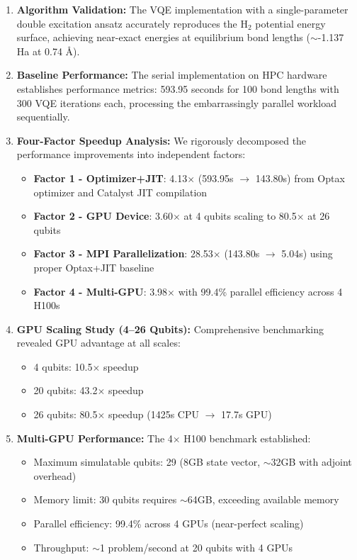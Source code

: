 \documentclass[11pt]{article}
\begin{document}
\begin{enumerate}
    \item \textbf{Algorithm Validation:} The VQE implementation with a single-parameter double excitation ansatz accurately reproduces the H$_2$ potential energy surface, achieving near-exact energies at equilibrium bond lengths ($\sim$-1.137 Ha at 0.74 \AA).

    \item \textbf{Baseline Performance:} The serial implementation on HPC hardware establishes performance metrics: 593.95 seconds for 100 bond lengths with 300 VQE iterations each, processing the embarrassingly parallel workload sequentially.

    \item \textbf{Four-Factor Speedup Analysis:} We rigorously decomposed the performance improvements into independent factors:
          \begin{itemize}
              \item \textbf{Factor 1 - Optimizer+JIT}: 4.13$\times$ (593.95s $\rightarrow$ 143.80s) from Optax optimizer and Catalyst JIT compilation
              \item \textbf{Factor 2 - GPU Device}: 3.60$\times$ at 4 qubits scaling to 80.5$\times$ at 26 qubits
              \item \textbf{Factor 3 - MPI Parallelization}: 28.53$\times$ (143.80s $\rightarrow$ 5.04s) using proper Optax+JIT baseline
              \item \textbf{Factor 4 - Multi-GPU}: 3.98$\times$ with 99.4\% parallel efficiency across 4 H100s
          \end{itemize}

    \item \textbf{GPU Scaling Study (4--26 Qubits):} Comprehensive benchmarking revealed GPU advantage at all scales:
          \begin{itemize}
              \item 4 qubits: 10.5$\times$ speedup
              \item 20 qubits: 43.2$\times$ speedup
              \item 26 qubits: 80.5$\times$ speedup (1425s CPU $\rightarrow$ 17.7s GPU)
          \end{itemize}

    \item \textbf{Multi-GPU Performance:} The 4$\times$ H100 benchmark established:
          \begin{itemize}
              \item Maximum simulatable qubits: 29 (8GB state vector, $\sim$32GB with adjoint overhead)
              \item Memory limit: 30 qubits requires $\sim$64GB, exceeding available memory
              \item Parallel efficiency: 99.4\% across 4 GPUs (near-perfect scaling)
              \item Throughput: $\sim$1 problem/second at 20 qubits with 4 GPUs
          \end{itemize}


\end{enumerate}
\end{document}
